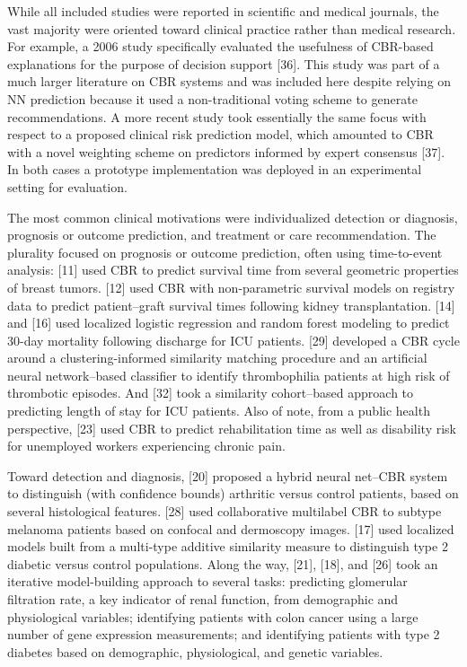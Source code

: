 \documentclass[preprint, 3p,
authoryear]{elsarticle} %
\begin{document}
While all included studies were reported in scientific and medical
journals, the vast majority were oriented toward clinical practice
rather than medical research. For example, a 2006 study specifically
evaluated the usefulness of CBR-based explanations for the purpose of
decision support {[}36{]}. This study was part of a much larger
literature on CBR systems and was included here despite relying on NN
prediction because it used a non-traditional voting scheme to generate
recommendations. A more recent study took essentially the same focus
with respect to a proposed clinical risk prediction model, which
amounted to CBR with a novel weighting scheme on predictors informed by
expert consensus {[}37{]}. In both cases a prototype implementation was
deployed in an experimental setting for evaluation.

The most common clinical motivations were individualized detection or
diagnosis, prognosis or outcome prediction, and treatment or care
recommendation. The plurality focused on prognosis or outcome
prediction, often using time-to-event analysis: {[}11{]} used CBR to
predict survival time from several geometric properties of breast
tumors. {[}12{]} used CBR with non-parametric survival models on
registry data to predict patient--graft survival times following kidney
transplantation. {[}14{]} and {[}16{]} used localized logistic
regression and random forest modeling to predict 30-day mortality
following discharge for ICU patients. {[}29{]} developed a CBR cycle
around a clustering-informed similarity matching procedure and an
artificial neural network--based classifier to identify thrombophilia
patients at high risk of thrombotic episodes. And {[}32{]} took a
similarity cohort--based approach to predicting length of stay for ICU
patients. Also of note, from a public health perspective, {[}23{]} used
CBR to predict rehabilitation time as well as disability risk for
unemployed workers experiencing chronic pain.

Toward detection and diagnosis, {[}20{]} proposed a hybrid neural
net--CBR system to distinguish (with confidence bounds) arthritic versus
control patients, based on several histological features. {[}28{]} used
collaborative multilabel CBR to subtype melanoma patients based on
confocal and dermoscopy images. {[}17{]} used localized models built
from a multi-type additive similarity measure to distinguish type 2
diabetic versus control populations. Along the way, {[}21{]}, {[}18{]},
and {[}26{]} took an iterative model-building approach to several tasks:
predicting glomerular filtration rate, a key indicator of renal
function, from demographic and physiological variables; identifying
patients with colon cancer using a large number of gene expression
measurements; and identifying patients with type 2 diabetes based on
demographic, physiological, and genetic variables.
\end{document}
